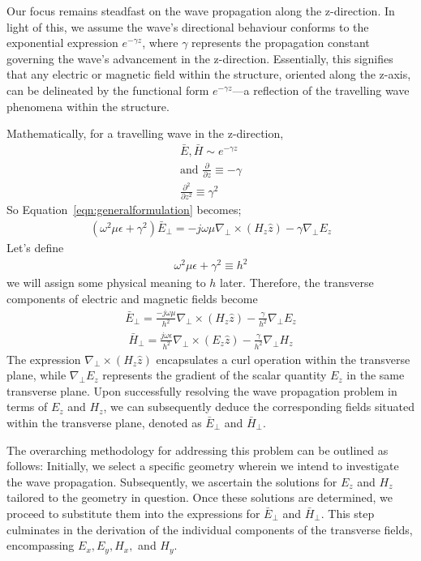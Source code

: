 Our focus remains steadfast on the wave propagation along the z-direction. In light of this, we assume the wave's directional behaviour conforms to the exponential expression $e^{-\gamma z}$, where $\gamma$ represents the propagation constant governing the wave's advancement in the z-direction. Essentially, this signifies that any electric or magnetic field within the structure, oriented along the z-axis, can be delineated by the functional form $e^{-\gamma z}$—a reflection of the travelling wave phenomena within the structure.

Mathematically, for a travelling wave in the z-direction,
\begin{align*}
\bar{E}, \bar{H} \sim e^{-\gamma z}\\
\text{and }\frac{\partial}{\partial z} \equiv -\gamma\\
\frac{\partial^2}{\partial z^2} \equiv \gamma^2
\end{align*}
So Equation~\ref{eqn:generalformulation} becomes;
\begin{align*}
(\omega^2\mu\epsilon + \gamma^2)\bar{E}_\bot = -j\omega\mu\nabla_\bot\times(H_z\hat{z})-\gamma\nabla_\bot E_z
\end{align*}
Let's define
\begin{align}
\omega^2\mu\epsilon + \gamma^2 \equiv h^2
\label{eqn:h}
\end{align}
we will assign some physical meaning to $h$ later. Therefore, the transverse components of electric and magnetic fields become
\begin{align}
\bar{E}_\bot = \frac{-j\omega\mu}{h^2}\nabla_\bot\times(H_z\hat{z}) - \frac{\gamma}{h^2}\nabla_\bot E_z
\label{eqn:transverseele2}
\end{align}
\begin{align}
\bar{H}_\bot = \frac{j\omega\epsilon}{h^2}\nabla_\bot\times(E_z\hat{z}) - \frac{\gamma}{h^2}\nabla_\bot H_z
\label{eqn:transversemag2}
\end{align}
The expression $\nabla_\bot\times(H_z\hat{z})$ encapsulates a curl operation within the transverse plane, while $\nabla_\bot E_z$ represents the gradient of the scalar quantity $E_z$ in the same transverse plane. Upon successfully resolving the wave propagation problem in terms of $E_z$ and $H_z$, we can subsequently deduce the corresponding fields situated within the transverse plane, denoted as $\bar{E}_\bot$ and $\bar{H}_\bot$.

The overarching methodology for addressing this problem can be outlined as follows: Initially, we select a specific geometry wherein we intend to investigate the wave propagation. Subsequently, we ascertain the solutions for $E_z$ and $H_z$ tailored to the geometry in question. Once these solutions are determined, we proceed to substitute them into the expressions for $\bar{E}_\bot$ and $\bar{H}_\bot$. This step culminates in the derivation of the individual components of the transverse fields, encompassing $E_x, E_y, H_x,$ and $H_y$.

